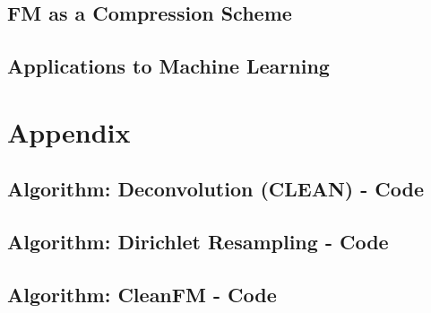 \documentclass[11pt,twoside]{report}
\numberwithin{thm}{section}
\numberwithin{equation}{section}
\begin{document}
\section{FM as a Compression Scheme}
\section{Applications to Machine Learning}

\chapter{Appendix}
\section{Algorithm: Deconvolution (CLEAN) - Code}
\section{Algorithm: Dirichlet Resampling - Code}
\section{Algorithm: CleanFM - Code}




\clearpage
{}








%
%
\end{document}

